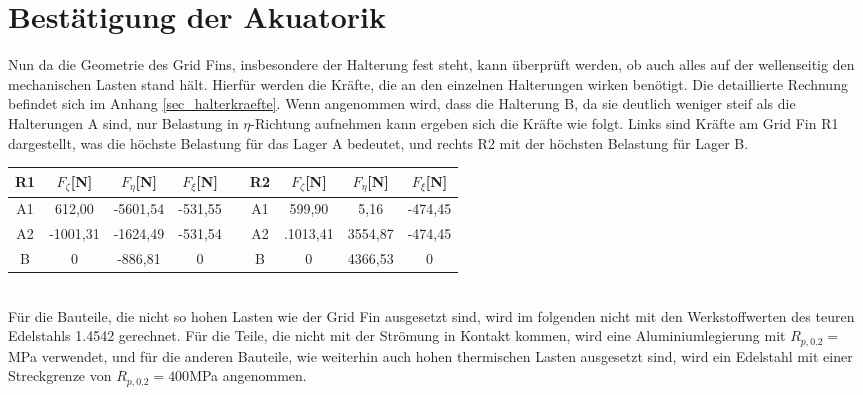 \section{Bestätigung der Akuatorik}
Nun da die Geometrie des Grid Fins, insbesondere der Halterung fest steht, kann überprüft werden, ob auch alles auf der wellenseitig den mechanischen Lasten stand hält. Hierfür werden die Kräfte, die an den einzelnen Halterungen wirken benötigt. Die detaillierte Rechnung befindet sich im Anhang \ref{sec_halterkraefte}. Wenn angenommen wird, dass die Halterung B, da sie deutlich weniger steif als die Halterungen A sind, nur Belastung in $\eta$-Richtung aufnehmen kann ergeben sich die Kräfte wie folgt. Links sind Kräfte am Grid Fin R1 dargestellt, was die höchste Belastung für das Lager A bedeutet, und rechts R2 mit der höchsten Belastung für Lager B.
\begin{table}[h] 
	\centering 
	\begin{tabular}{c|c|c|cc||c|c|c|c} 
		\textbf{R1}&$F_{\zeta}$[N]&$F_\eta$[N]&$F_\xi$[N]&&\textbf{R2}&$F_{\zeta}$[N]&$F_\eta$[N]&$F_\xi$[N]\\ 
		\hline 
		A1& 612,00&-5601,54&-531,55&&A1&599,90&5,16&-474,45\\
		A2&-1001,31&-1624,49&-531,54&&A2&.1013,41&3554,87&-474,45\\
		B&0&-886,81&0&&B&0&4366,53&0\\
	\end{tabular}
\end{table} \\
Für die Bauteile, die nicht so hohen Lasten wie der Grid Fin ausgesetzt sind, wird im folgenden nicht mit den Werkstoffwerten des teuren Edelstahls 1.4542 gerechnet. Für die Teile, die nicht mit der Strömung in Kontakt kommen, wird eine Aluminiumlegierung mit $R_{p,0.2} = $MPa verwendet, und für die anderen Bauteile, wie weiterhin auch hohen thermischen Lasten ausgesetzt sind, wird ein Edelstahl mit einer Streckgrenze von $R_{p,0.2} = 400$MPa angenommen.
